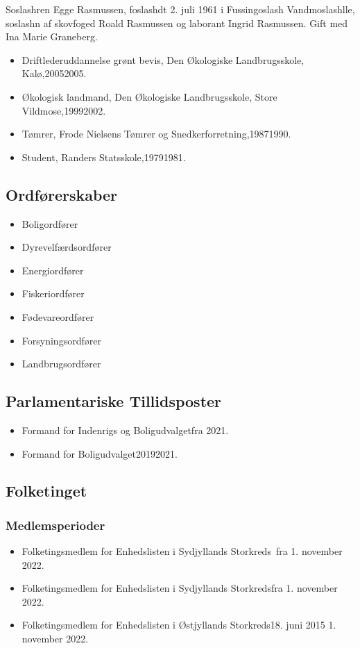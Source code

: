 \documentclass[11pt, a4paper]{awesome-cv}
\begin{document}
\makecvheader[R]
\makelettertitle
\begin{cvletter}
Soslashren Egge Rasmussen, foslashdt 2. juli 1961 i Fussingoslash Vandmoslashlle, soslashn af skovfoged Roald Rasmussen og laborant Ingrid Rasmussen. Gift med Ina Marie Graneberg.

\begin{itemize}
\item Driftlederuddannelse grønt bevis, Den Økologiske Landbrugsskole, Kalø,20052005.
\item Økologisk landmand, Den Økologiske Landbrugsskole, Store Vildmose,19992002.
\item Tømrer, Frode Nielsens Tømrer og Snedkerforretning,19871990.
\item Student, Randers Statsskole,19791981.
\end{itemize}
\subsection*{Ordførerskaber}
\begin{itemize}
\item Boligordfører
\item Dyrevelfærdsordfører
\item Energiordfører
\item Fiskeriordfører
\item Fødevareordfører
\item Forsyningsordfører
\item Landbrugsordfører
\end{itemize}
\subsection*{Parlamentariske Tillidsposter}
\begin{itemize}
\item Formand for Indenrigs og Boligudvalgetfra 2021.
\item Formand for Boligudvalget20192021.
\end{itemize}
\subsection*{Folketinget}
\subsubsection*{Medlemsperioder}
\begin{itemize}
\item Folketingsmedlem for Enhedslisten i Sydjyllands Storkreds fra 1. november 2022.
\item Folketingsmedlem for Enhedslisten i Sydjyllands Storkredsfra 1. november 2022.
\item Folketingsmedlem for Enhedslisten i Østjyllands Storkreds18. juni 2015  1. november 2022.
\end{itemize}

\end{cvletter}
\end{document}
